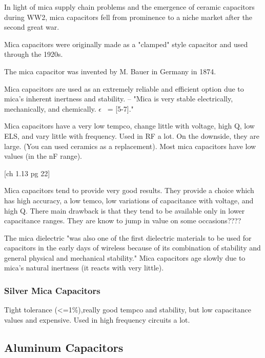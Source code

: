 In light of mica supply chain problems and the emergence of ceramic capacitors during WW2, mica capacitors fell from prominence to a niche market after the second great war.\cite[Ch 3, Sec II]{cerMaterials}

Mica capacitors were originally made as a "clamped" style capacitor and used through the 1920s\cite{wiki_mica}. 

The mica capacitor was invented by M. Bauer in Germany in 1874. 

Mica capacitors are used as an extremely reliable and efficient option due to mica's inherent inertness and stability. \cite{tedds_mica}    
--
"Mica is very stable electrically, mechanically, and chemically. $\epsilon$ ~= [5-7].\cite{uiowa_mica}"

Mica capacitors have a very low tempco, change little with voltage, high Q, low ELS, and vary little with frequency. Used in RF a lot. On the downside, they are large. (You can used ceramics as a replacement). Most mica capacitors have low values (in the nF range).\cite{uiowa_mica}

\cite{hh2}[ch 1.13 pg 22]
\nocite{capGuide_mica}

Mica capacitors tend to provide very good results. They provide a choice which has high accuracy, a low temco, low variations of capacitance with voltage, and high Q. There main drawback is that they tend to be available only in lower capacitance ranges. They are know to jump in value on some occasions???? 
\cite{radio_mica}

The mica dielectric "was also one of the first dielectric materials to be used for capacitors in the early days of wireless because of its combination of stability and general physical and mechanical stability." Mica capacitors age slowly due to mica's natural inertness (it reacts with very little).\cite{radio_mica}

\subsubsection{Silver Mica Capacitors}

Tight tolerance (<=1\%),really good tempco and stability, but low capacitance values and expensive. Used in high frequency circuits a lot.\cite{learn_caps}

\subsection{Aluminum Capacitors}

